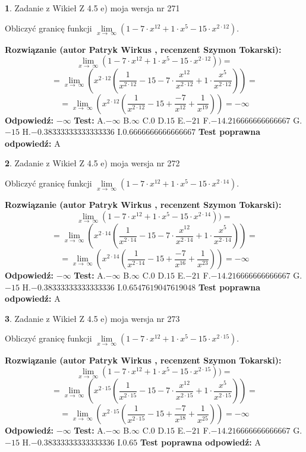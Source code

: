 \documentclass[12pt, a4paper]{article}
\theoremstyle{definition} %
\newtheorem{zad}{}
\newcommand{\zadStart}[1]{\begin{zad}#1\newline}
\newcommand{\zadStop}{\end{zad}}
\newcommand{\rozwStart}[2]{\noindent \textbf{Rozwiązanie (autor #1 , recenzent #2): }\newline}
\newcommand{\rozwStop}{\newline}
\newcommand{\odpStart}{\noindent \textbf{Odpowiedź:}\newline}
\newcommand{\odpStop}{\newline}
\newcommand{\testStart}{\noindent \textbf{Test:}\newline}
\newcommand{\testStop}{\newline}
\newcommand{\kluczStart}{\noindent \textbf{Test poprawna odpowiedź:}\newline}
\newcommand{\kluczStop}{\newline}
\begin{document}
\zadStart{Zadanie z Wikieł Z 4.5 e) moja wersja nr 271}


Obliczyć granicę funkcji  $\lim\limits_{x\to\ \infty}(1 - 7 \cdot x^{12}+1 \cdot x^{5}- 15 \cdot x^{2\cdot12})$.
\zadStop
\rozwStart{Patryk Wirkus}{Szymon Tokarski}
$$\lim\limits_{x\to\ \infty}(1 - 7 \cdot x^{12}+1 \cdot x^{5}- 15 \cdot x^{2\cdot12}))=$$
$$=\lim\limits_{x\to\ \infty}(x^{2\cdot12}(\frac{1}{x^{2\cdot12}}-15 -7 \cdot \frac{x^{12}}{x^{2\cdot12}}+1 \cdot \frac{x^{5}}{x^{2\cdot12}}))=$$
$$=\lim\limits_{x\to\ \infty}(x^{2\cdot12}(\frac{1}{x^{2\cdot12}}-15 + \frac{-7}{x^{12}}+ \frac{1}{x^{19}}))=-\infty$$
\rozwStop
\odpStart
$-\infty$
\odpStop
\testStart
A.$-\infty$ B.$\infty$ C.$0$ D.$15$ E.$-21$
F.$-14.216666666666667$ G.$-15$
H.$-0.38333333333333336$
I.$0.6666666666666667$
\testStop
\kluczStart
A
\kluczStop



\zadStart{Zadanie z Wikieł Z 4.5 e) moja wersja nr 272}


Obliczyć granicę funkcji  $\lim\limits_{x\to\ \infty}(1 - 7 \cdot x^{12}+1 \cdot x^{5}- 15 \cdot x^{2\cdot14})$.
\zadStop
\rozwStart{Patryk Wirkus}{Szymon Tokarski}
$$\lim\limits_{x\to\ \infty}(1 - 7 \cdot x^{12}+1 \cdot x^{5}- 15 \cdot x^{2\cdot14}))=$$
$$=\lim\limits_{x\to\ \infty}(x^{2\cdot14}(\frac{1}{x^{2\cdot14}}-15 -7 \cdot \frac{x^{12}}{x^{2\cdot14}}+1 \cdot \frac{x^{5}}{x^{2\cdot14}}))=$$
$$=\lim\limits_{x\to\ \infty}(x^{2\cdot14}(\frac{1}{x^{2\cdot14}}-15 + \frac{-7}{x^{16}}+ \frac{1}{x^{23}}))=-\infty$$
\rozwStop
\odpStart
$-\infty$
\odpStop
\testStart
A.$-\infty$ B.$\infty$ C.$0$ D.$15$ E.$-21$
F.$-14.216666666666667$ G.$-15$
H.$-0.38333333333333336$
I.$0.6547619047619048$
\testStop
\kluczStart
A
\kluczStop



\zadStart{Zadanie z Wikieł Z 4.5 e) moja wersja nr 273}


Obliczyć granicę funkcji  $\lim\limits_{x\to\ \infty}(1 - 7 \cdot x^{12}+1 \cdot x^{5}- 15 \cdot x^{2\cdot15})$.
\zadStop
\rozwStart{Patryk Wirkus}{Szymon Tokarski}
$$\lim\limits_{x\to\ \infty}(1 - 7 \cdot x^{12}+1 \cdot x^{5}- 15 \cdot x^{2\cdot15}))=$$
$$=\lim\limits_{x\to\ \infty}(x^{2\cdot15}(\frac{1}{x^{2\cdot15}}-15 -7 \cdot \frac{x^{12}}{x^{2\cdot15}}+1 \cdot \frac{x^{5}}{x^{2\cdot15}}))=$$
$$=\lim\limits_{x\to\ \infty}(x^{2\cdot15}(\frac{1}{x^{2\cdot15}}-15 + \frac{-7}{x^{18}}+ \frac{1}{x^{25}}))=-\infty$$
\rozwStop
\odpStart
$-\infty$
\odpStop
\testStart
A.$-\infty$ B.$\infty$ C.$0$ D.$15$ E.$-21$
F.$-14.216666666666667$ G.$-15$
H.$-0.38333333333333336$
I.$0.65$
\testStop
\kluczStart
A
\kluczStop
\end{document}
